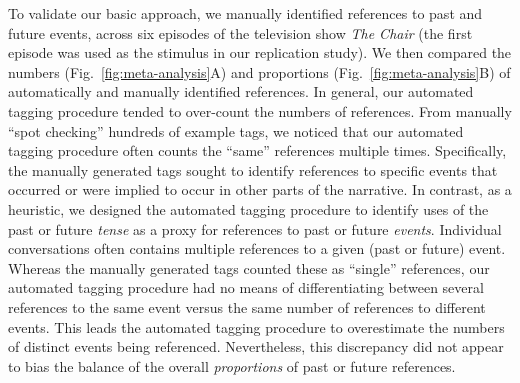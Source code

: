 \documentclass[10pt]{article}
\begin{document}
To validate our basic approach, we manually identified references to past and future events, across six episodes of the television show \textit{The Chair} (the first episode was used as the stimulus in our replication study). We then compared the numbers (Fig.~\ref{fig:meta-analysis}A) and proportions (Fig.~\ref{fig:meta-analysis}B) of automatically and manually identified references. In general, our automated tagging procedure tended to over-count the numbers of references. From manually ``spot checking'' hundreds of example tags, we noticed that our automated tagging procedure often counts the ``same'' references multiple times. Specifically, the manually generated tags sought to identify references to specific events that occurred or were implied to occur in other parts of the narrative. In contrast, as a heuristic, we designed the automated tagging procedure to identify uses of the past or future \textit{tense} as a proxy for references to past or future \textit{events}. Individual conversations often contains multiple references to a given (past or future) event. Whereas the manually generated tags counted these as ``single'' references, our automated tagging procedure had no means of differentiating between several references to the same event versus the same number of references to different events. This leads the automated tagging procedure to overestimate the numbers of distinct events being referenced. Nevertheless, this discrepancy did not appear to bias the balance of the overall \textit{proportions} of past or future references.
\end{document}
